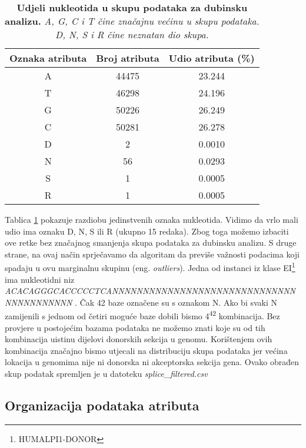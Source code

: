 \begin{table}[!ht]
   \caption[Udjeli nukleotida u skupu podataka za dubinsku analizu]{
   \textbf{Udjeli nukleotida u skupu podataka za dubinsku analizu.} \textit{A, G, C i T čine značajnu većinu u skupu podataka. D, N, S i R čine neznatan dio skupa.}}
   \centering
   \begin{tabular}{||c | c | c ||}
   \hline
   Oznaka atributa & Broj atributa & Udio atributa (\%) \\ [0.5ex]
   \hline\hline
   A & 44475 & 23.244 \\
   T & 46298 & 24.196 \\
   G & 50226 & 26.249 \\
   C & 50281 & 26.278 \\
   D & 2  & 0.0010 \\
   N & 56 & 0.0293 \\
   S & 1  & 0.0005 \\
   R & 1  & 0.0005 \\ [1ex]
   \hline
   \end{tabular}
   \label{tab:udjeli}
\end{table}
Tablica \ref{tab:udjeli} pokazuje razdiobu jedinstvenih oznaka nukleotida. Vidimo da vrlo mali udio ima oznaku D, N, S ili R (ukupno 15 redaka). Zbog toga možemo izbaciti ove retke bez značajnog smanjenja skupa podataka za dubinsku analizu. S druge strane, na ovaj način sprječavamo da algoritam da previše važnosti podacima koji spadaju u ovu marginalnu skupinu (eng. \textit{outliers}). 
Jedna od instanci iz klase EI\footnote{HUMALPI1-DONOR} ima nukleotidni niz\textit{ 
ACACAGGGCACCCCCTCANNNNNNNNNNNNNNNNNNNNNNNNNNNNNNNNNNNNNNNNN
}. Čak 42 baze označene su s oznakom N. Ako bi svaki N zamijenili s jednom od četiri moguće baze dobili bismo 4\textsuperscript{42} kombinacija. Bez provjere u postojećim bazama podataka ne možemo znati koje su od tih kombinacija uistinu dijelovi donorskih sekcija u genomu. Korištenjem ovih kombinacija značajno bismo utjecali na distribuciju skupa podataka jer većina lokacija u genomima nije ni donorska ni akceptorska sekcija gena. 
Ovako obrađen skup podatak spremljen je u datoteku \textit{splice\_filtered.csv}

\subsection{Organizacija podataka atributa}

